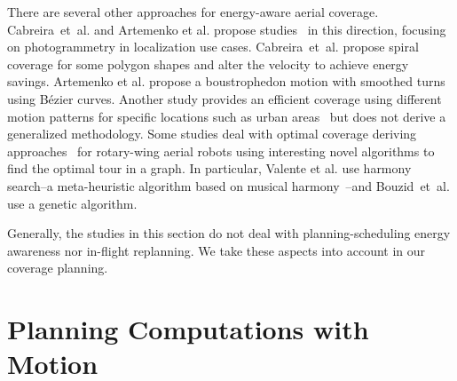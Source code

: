 There are several other approaches for energy-aware aerial coverage. Cabreira~et~al. and Artemenko et al. propose studies~\citep{cabreira2018energy,artemenko2016energy} in this direction, focusing on photogrammetry in localization use cases. Cabreira~et~al. propose spiral coverage for some polygon shapes and alter the velocity to achieve energy savings. Artemenko et al. propose a boustrophedon motion with smoothed turns using B\'{e}zier curves. %
Another study provides an efficient coverage using different motion patterns for specific locations such as urban areas~\citep{dille2013efficient} but does not derive a generalized methodology. Some studies deal with optimal coverage deriving approaches~\citep{valente2013aerial,bouzid2017quadrotor} for rotary-wing aerial robots using interesting novel algorithms to find the optimal tour in a graph. In particular, Valente et al. use harmony search--a meta-heuristic algorithm based on musical harmony~\citep{geem2009music}--and Bouzid~et~al. use a genetic algorithm. 

Generally, the studies in this section do not deal with planning-scheduling energy awareness nor in-flight replanning. We take these aspects into account in our coverage planning.


\section{Planning Computations with Motion}
\label{sec:soa-comp-motion-pl}

